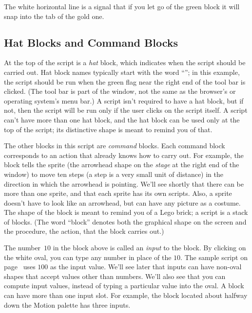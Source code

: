 \documentclass{report}
\begin{document}

The white horizontal line is a signal that if you let go of the green block it will snap into the tab of the gold one.

\subsection{Hat Blocks and Command Blocks}

At the top of the script is a \emph{hat} block, which indicates when the script should be carried out. Hat block names typically start with the word ``''; in this example, the script should be run when the green flag near the right end of the \Snap{} tool bar is clicked. (The \Snap{} tool bar is part of the \Snap{} window, not the same as the browser's or operating system's menu bar.) A script isn't required to have a hat block, but if not, then the script will be run only if the user clicks on the script itself. A script can't have more than one hat block, and the hat block can be used only at the top of the script; its distinctive shape is meant to remind you of that.

The other blocks in this script are \emph{command} blocks. Each command block corresponds to an action that \Snap{} already knows how to carry out. For example, the block  tells the sprite (the arrowhead shape on the \emph{stage} at the right end of the window) to move ten steps (a step is a very small unit of distance) in the direction in which the arrowhead is pointing. We'll see shortly that there can be more than one sprite, and that each sprite has its own scripts. Also, a sprite doesn't have to look like an arrowhead, but can have any picture as a costume. The shape of the  block is meant to remind you of a Lego\texttrademark{} brick; a script is a stack of blocks. (The word ``block'' denotes both the graphical shape on the screen and the procedure, the action, that the block carries out.)

The number~$10$ in the  block above is called an \emph{input} to the block. By clicking on the white oval, you can type any number in place of the $10$. The sample script on page~\pageref{fig:typical-script} uses $100$ as the input value. We'll see later that inputs can have non-oval shapes that accept values other than numbers. We'll also see that you can compute input values, instead of typing a particular value into the oval. A block can have more than one input slot. For example, the  block located about halfway down the Motion palette has three inputs.
\end{document}
